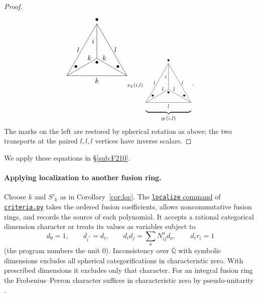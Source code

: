 \documentclass{amsart}
\begin{document}
\begin{proof}
\begin{equation}
{{{{\begin{tikzpicture}[scale=1.5]
\draw (0,0) -- (1,0)  node [below] {$k$}; \draw (1,0)  -- (2,0);
\draw (2,0) -- (1.5,.866) node [right] {$l$}; \draw (1.5,.866) -- (1,1.732);
\draw (1,1.732) node [above] {$\bullet$} -- (.5,.866) node [left] {$l$}; \draw (.5,.866) -- (0,0);
\draw (0,0) -- (.75,.433) node [above] {$k$}; \draw (.75,.433) -- (1,0.577);
\draw (1,0.577) node [below] {$\bullet$} -- (1,1.1545) node [left] {$i$}; \draw (1,1.1545) -- (1,1.732);
\draw (1,0.577) -- (1.25,.433) node [above] {$k$}; \draw (1.25,.433) -- (2,0);
\node at (.3,.3) {$\bullet$};
\node at (2-.3,.3) {$\bullet$};
\end{tikzpicture}}}}}_{x_k(i,l)}\,\underbrace{\vcenter{\hbox{\scalebox{.75}{\begin{tikzpicture}[scale=1.5]
\draw (0,0) -- (1,0)  node [below] {$l$}; \draw (1,0)  -- (2,0);
\draw (2,0) -- (1.5,.866) node [right] {$l$}; \draw (1.5,.866) -- (1,1.732);
\draw (1,1.732) node [above] {$\bullet$} -- (.5,.866) node [left] {$l$}; \draw (.5,.866) -- (0,0);
\draw (0,0) -- (.75,.433) node [above] {$l$}; \draw (.75,.433) -- (1,0.577);
\draw (1,0.577) node [below] {$\bullet$} -- (1,1.1545) node [left] {$i$}; \draw (1,1.1545) -- (1,1.732);
\draw (1,0.577) -- (1.25,.433) node [above] {$l$}; \draw (1.25,.433) -- (2,0);
\node at (.3,.3) {$\bullet$};
\node at (2-.3,.3) {$\bullet$};
\end{tikzpicture}}}}}_{y_l(i,l)}.
\end{equation}
The marks on the left are restored by spherical rotation as above;
the two transports at the paired $l,l,l$ vertices have inverse scalars.
\end{proof}
We apply these equations in \S\ref{sub:F210}.

\paragraph{Applying localization to another fusion ring.}
Choose $k$ and $S'_k$ as in Corollary~\ref{cor:loc}. The \href{https://github.com/sebastienpalcoux/triangular-prism-categorification/blob/f816c697fde088b261e1fe1ce703980e5dbdab51/criteria.py#L26-L30}{\texttt{localize} command} of \href{https://github.com/sebastienpalcoux/triangular-prism-categorification/blob/f816c697fde088b261e1fe1ce703980e5dbdab51/criteria.py}{\texttt{criteria.py}} takes the ordered fusion coefficients, allows noncommutative fusion rings, and records the source of each polynomial. It accepts a rational categorical dimension character or treats its values as variables subject to
\[
 d_0=1,\qquad d_{i^*}=d_i,\qquad d_i d_j=\sum_aN_{ij}^a d_a,
 \qquad d_i r_i=1
\]
(the program numbers the unit $0$). Inconsistency over $\overline{\mathbb Q}$ with symbolic dimensions excludes all spherical categorifications in characteristic zero. With prescribed dimensions it excludes only that character. For an integral fusion ring the Frobenius--Perron character suffices in characteristic zero by pseudo-unitarity \cite[Proposition~8.24]{ENO05}.
\end{document}
